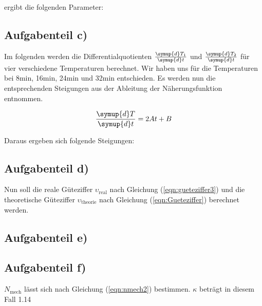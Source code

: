         ergibt die folgenden Parameter:

        


        \subsection{Aufgabenteil c)}

        Im folgenden werden die Differentialquotienten $\frac{\symup{d} T_1}{\symup{d} t}$ und $\frac{\symup{d} T_2}{\symup{d} t}$ für vier verschiedene Temperaturen berechnet.
        Wir haben uns für die Temperaturen bei 8min, 16min, 24min und 32min entschieden.
        Es werden nun die entsprechenden Steigungen aus der Ableitung der Näherungsfunktion entnommen.

        \begin{equation}
        \frac{\symup{d}T}{\symup{d}t} = 2At + B
        \end{equation}

        Daraus ergeben sich folgende Steigungen:
        
        


        \newpage
        \subsection{Aufgabenteil d)}

        Nun soll die reale Güteziffer $\upsilon_\text{real}$ nach Gleichung (\ref{eqn:gueteziffer3}) und die theoretische Güteziffer $\upsilon_\text{theorie}$ nach Gleichung (\ref{eqn:Gueteziffer}) berechnet werden.

        



        \subsection{Aufgabenteil e)}


        \subsection{Aufgabenteil f)}

        $N_\text{mech}$ lässt sich nach Gleichung (\ref{eqn:nmech2}) bestimmen.
        $\kappa$ beträgt in diesem Fall 1.14

        